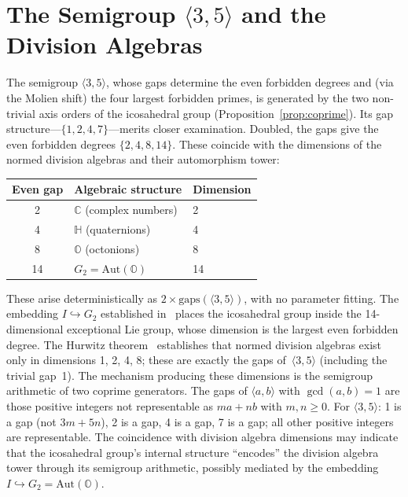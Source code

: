 \documentclass[11pt,letterpaper]{article}
\theoremstyle{definition}
\newcommand{\HH}{\mathbb{H}}
\newcommand{\OO}{\mathbb{O}}
\newcommand{\gen}[1]{\langle #1 \rangle}
\begin{document}
\section{The Semigroup \texorpdfstring{$\gen{3,5}$}{<3,5>} and the Division Algebras}\label{sec:semigroup}
The semigroup $\gen{3,5}$, whose gaps determine the even forbidden degrees and (via the Molien shift) the four largest forbidden primes, is generated by the two non-trivial axis orders of the icosahedral group (Proposition~\ref{prop:coprime}).  Its gap structure---$\{1,2,4,7\}$---merits closer examination.
Doubled, the gaps give the even forbidden degrees $\{2,4,8,14\}$.  These coincide with the dimensions of the normed division algebras and their automorphism tower:
\begin{center}
\begin{tabular}{cll}
\toprule
Even gap & Algebraic structure & Dimension \\
\midrule
2  & $\mathbb{C}$ (complex numbers) & 2 \\
4  & $\HH$ (quaternions) & 4 \\
8  & $\OO$ (octonions) & 8 \\
14 & $G_2=\mathrm{Aut}(\OO)$ & 14 \\
\bottomrule
\end{tabular}
\end{center}
These arise deterministically as $2\times\mathrm{gaps}(\gen{3,5})$, with no parameter fitting.  The embedding $I\hookrightarrow G_2$ established in~\cite{Meucci2026loop,Baez2002} places the icosahedral group inside the 14-dimensional exceptional Lie group, whose dimension is the largest even forbidden degree.  The Hurwitz theorem~\cite{Hurwitz1898} establishes that normed division algebras exist only in dimensions 1, 2, 4, 8; these are exactly the gaps of~$\gen{3,5}$ (including the trivial gap~1).
The mechanism producing these dimensions is the semigroup arithmetic of two coprime generators.  The gaps of $\gen{a,b}$ with $\gcd(a,b)=1$ are those positive integers not representable as $ma+nb$ with $m,n\ge0$.  For $\gen{3,5}$: 1 is a gap (not $3m+5n$), 2 is a gap, 4 is a gap, 7 is a gap; all other positive integers are representable.  The coincidence with division algebra dimensions may indicate that the icosahedral group's internal structure ``encodes'' the division algebra tower through its semigroup arithmetic, possibly mediated by the embedding $I\hookrightarrow G_2=\mathrm{Aut}(\OO)$.
\end{document}
